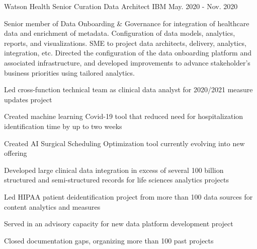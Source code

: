 \begin{cventries}
  \cventry
    {Watson Health} %
    {Senior Curation Data Architect} %
    {IBM}
    {May. 2020 - Nov. 2020}
    {
      \begin{cvparagraph}
        Senior member of Data Onboarding \& Governance for integration of healthcare data and enrichment of metadata. Configuration of data models, analytics, reports, and visualizations. SME to project data architects, delivery, analytics, integration, etc. Directed the configuration of the data onboarding platform and associated infrastructure, and developed improvements to advance stakeholder’s business priorities using tailored analytics.
      \end{cvparagraph}
      \begin{cvitems} %
        \item {Led cross-function technical team as clinical data analyst for 2020/2021 measure updates project}
        \item {Created machine learning Covid-19 tool that reduced need for hospitalization identification time by up to two weeks}
        \item {Created AI Surgical Scheduling Optimization tool currently evolving into new offering}
        \item {Developed large clinical data integration in excess of several 100 billion structured and semi-structured records for life sciences analytics projects}
        \item {Led HIPAA patient deidentification project from more than 100 data sources for content analytics and measures}
        \item {Served in an advisory capacity for new data platform development project}
        \item {Closed documentation gaps, organizing more than 100 past projects}
      \end{cvitems}
    }


\end{cventries}

